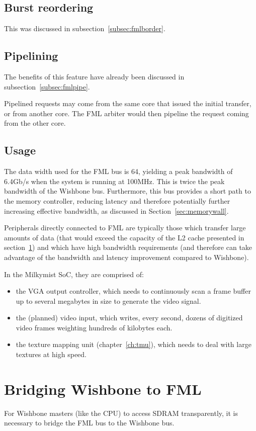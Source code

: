 \documentclass[a4paper,11pt]{kthesis}
\begin{document}
\subsection{Burst reordering}
This was discussed in subsection~\ref{subsec:fmlborder}.

\subsection{Pipelining}
The benefits of this feature have already been discussed in subsection~\ref{subsec:fmlpipe}.

Pipelined requests may come from the same core that issued the initial transfer, or from another core. The FML arbiter would then pipeline the request coming from the other core.

\subsection{Usage}
The data width used for the FML bus is 64, yielding a peak bandwidth of 6.4Gb/s when the system is running at 100MHz. This is twice the peak bandwidth of the Wishbone bus. Furthermore, this bus provides a short path to the memory controller, reducing latency and therefore potentially further increasing effective bandwidth, as discussed in Section~\ref{sec:memorywall}.

Peripherals directly connected to FML are typically those which transfer large amounts of data (that would exceed the capacity of the L2 cache presented in section~\ref{sec:fmlbrg}) and which have high bandwidth requirements (and therefore can take advantage of the bandwidth and latency improvement compared to Wishbone).

In the Milkymist SoC, they are comprised of:
\begin{itemize}
\item the VGA output controller, which needs to continuously scan a frame buffer up to several megabytes in size to generate the video signal.
\item the (planned) video input, which writes, every second, dozens of digitized video frames weighting hundreds of kilobytes each.
\item the texture mapping unit (chapter~\ref{ch:tmu}), which needs to deal with large textures at high speed.
\end{itemize}

\section{Bridging Wishbone to FML}
\label{sec:fmlbrg}
For Wishbone masters (like the CPU) to access SDRAM transparently, it is necessary to bridge the FML bus to the Wishbone bus.
\end{document}

